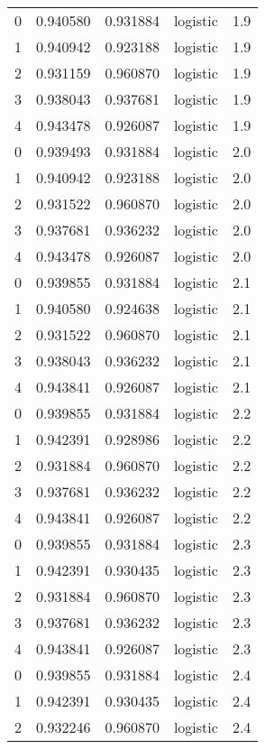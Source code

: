 \begin{tabular}{rrrlr}
     0 & 0.940580 & 0.931884 & logistic &        1.9 \\
     1 & 0.940942 & 0.923188 & logistic &        1.9 \\
     2 & 0.931159 & 0.960870 & logistic &        1.9 \\
     3 & 0.938043 & 0.937681 & logistic &        1.9 \\
     4 & 0.943478 & 0.926087 & logistic &        1.9 \\
     0 & 0.939493 & 0.931884 & logistic &        2.0 \\
     1 & 0.940942 & 0.923188 & logistic &        2.0 \\
     2 & 0.931522 & 0.960870 & logistic &        2.0 \\
     3 & 0.937681 & 0.936232 & logistic &        2.0 \\
     4 & 0.943478 & 0.926087 & logistic &        2.0 \\
     0 & 0.939855 & 0.931884 & logistic &        2.1 \\
     1 & 0.940580 & 0.924638 & logistic &        2.1 \\
     2 & 0.931522 & 0.960870 & logistic &        2.1 \\
     3 & 0.938043 & 0.936232 & logistic &        2.1 \\
     4 & 0.943841 & 0.926087 & logistic &        2.1 \\
     0 & 0.939855 & 0.931884 & logistic &        2.2 \\
     1 & 0.942391 & 0.928986 & logistic &        2.2 \\
     2 & 0.931884 & 0.960870 & logistic &        2.2 \\
     3 & 0.937681 & 0.936232 & logistic &        2.2 \\
     4 & 0.943841 & 0.926087 & logistic &        2.2 \\
     0 & 0.939855 & 0.931884 & logistic &        2.3 \\
     1 & 0.942391 & 0.930435 & logistic &        2.3 \\
     2 & 0.931884 & 0.960870 & logistic &        2.3 \\
     3 & 0.937681 & 0.936232 & logistic &        2.3 \\
     4 & 0.943841 & 0.926087 & logistic &        2.3 \\
     0 & 0.939855 & 0.931884 & logistic &        2.4 \\
     1 & 0.942391 & 0.930435 & logistic &        2.4 \\
     2 & 0.932246 & 0.960870 & logistic &        2.4 \\

\end{tabular}
